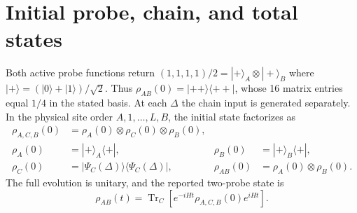 \documentclass[10pt,a4paper]{article}
\begin{document}
\section{Initial probe, chain, and total states}
Both active probe functions return $(1,1,1,1)/2=|+\rangle_A\otimes|+\rangle_B$ where $|+\rangle=(|0\rangle+|1\rangle)/\sqrt2$. Thus $\rho_{AB}(0)=|++\rangle\langle++|$, whose 16 matrix entries equal $1/4$ in the stated basis. At each $\Delta$ the chain input is generated separately. In the physical site order $A,1,\ldots,L,B$, the initial state factorizes as
\begin{align}
\rho_{A,C,B}(0)
  &=\rho_A(0)\otimes\rho_C(0)\otimes\rho_B(0),\\
\rho_A(0)&=|+\rangle_A\langle+|,
&\rho_B(0)&=|+\rangle_B\langle+|,\\
\rho_C(0)&=|\Psi_C(\Delta)\rangle\langle\Psi_C(\Delta)|,
&\rho_{AB}(0)&=\rho_A(0)\otimes\rho_B(0).
\end{align}
The full evolution is unitary, and the reported two-probe state is
\begin{equation}
\rho_{AB}(t)=\operatorname{Tr}_C\!\left[
e^{-iHt}\rho_{A,C,B}(0)e^{iHt}
\right].
\end{equation}
\end{document}

